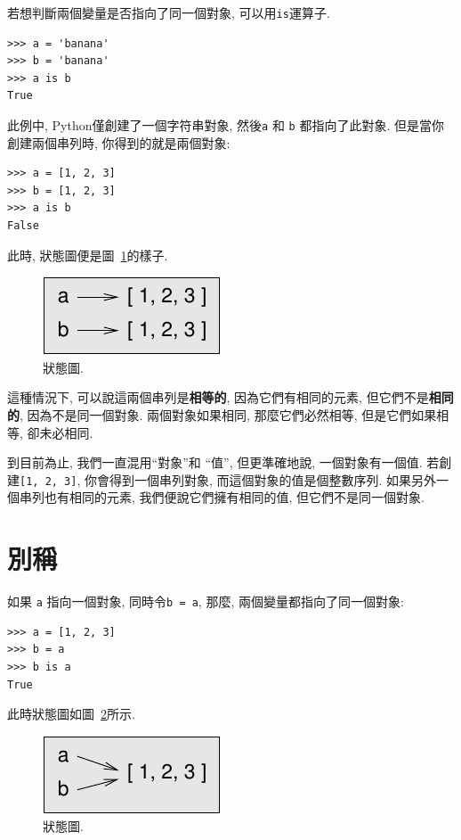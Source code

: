 \documentclass[10pt]{book}
\begin{document}
若想判斷兩個變量是否指向了同一個對象, 可以用{\tt is}運算子.

\begin{verbatim}
>>> a = 'banana'
>>> b = 'banana'
>>> a is b
True
\end{verbatim}
%
此例中, Python僅創建了一個字符串對象, 然後{\tt a} 
和 {\tt b} 都指向了此對象. 
但是當你創建兩個串列時, 你得到的就是兩個對象:

\begin{verbatim}
>>> a = [1, 2, 3]
>>> b = [1, 2, 3]
>>> a is b
False
\end{verbatim}
%

此時, 狀態圖便是圖~\ref{fig.list2}的樣子.

\begin{figure}
\centerline
{\includegraphics[scale=0.8]{figs/list2.pdf}}
\caption{狀態圖.}
\label{fig.list2}
\end{figure}

這種情況下, 可以說這兩個串列是{\bf 相等的},
因為它們有相同的元素, 
但它們不是{\bf 相同的}, 因為不是同一個對象. 
兩個對象如果相同, 那麼它們必然相等, 
但是它們如果相等, 卻未必相同. 

到目前為止, 我們一直混用``對象''和 ``值'', 但更準確地說, 
一個對象有一個值. 若創建{\tt [1, 2, 3]}, 你會得到一個串列對象, 
而這個對象的值是個整數序列. 
如果另外一個串列也有相同的元素, 我們便說它們擁有相同的值, 
但它們不是同一個對象. 


\section{別稱}

如果 {\tt a} 指向一個對象, 同時令{\tt b = a},
那麼, 兩個變量都指向了同一個對象:

\begin{verbatim}
>>> a = [1, 2, 3]
>>> b = a
>>> b is a
True
\end{verbatim}
%
此時狀態圖如圖~\ref{fig.list3}所示.

\begin{figure}
\centerline
{\includegraphics[scale=0.8]{figs/list3.pdf}}
\caption{狀態圖.}
\label{fig.list3}
\end{figure}
\end{document}
